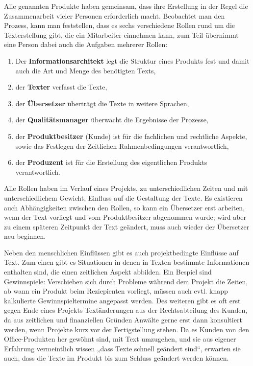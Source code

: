 \documentclass[11pt,a4paper]{article}
\begin{document}
Alle genannten Produkte haben gemeinsam, dass ihre Erstellung in der Regel die Zusammenarbeit vieler Personen erforderlich macht. Beobachtet man den Prozess, kann man feststellen, dass es sechs verschiedene Rollen rund um die Texterstellung gibt, die ein Mitarbeiter einnehmen kann, zum Teil übernimmt eine Person dabei auch die Aufgaben mehrerer Rollen:
\begin{enumerate}
\addtolength{\itemsep}{-0.5\baselineskip}
\item Der \textbf{Informationsarchitekt} legt die Struktur eines Produkts fest und damit auch die Art und Menge des benötigten Texts,
\item der \textbf{Texter} verfasst die Texte,
\item der \textbf{Übersetzer} überträgt die Texte in weitere Sprachen,
\item der \textbf{Qualitätsmanager} überwacht die Ergebnisse der Prozesse,
\item der \textbf{Produktbesitzer} (Kunde) ist für die fachlichen und rechtliche Aspekte, sowie das Festlegen der Zeitlichen Rahmenbedingungen verantwortlich,
\item der \textbf{Produzent} ist für die Erstellung des eigentlichen Produkts verantwortlich.
\end{enumerate}
Alle Rollen haben im Verlauf eines Projekts, zu unterschiedlichen Zeiten und mit unterschiedlichem Gewicht, Einfluss auf die Gestaltung der Texte. Es existieren auch Abhängigkeiten zwischen den Rollen, so kann ein Übersetzer erst arbeiten, wenn der Text vorliegt und vom Produktbesitzer abgenommen wurde; wird aber zu einem späteren Zeitpunkt der Text geändert, muss auch wieder der Übersetzer neu beginnen.

Neben den menschlichen Einflüssen gibt es auch projektbedingte Einflüsse auf Text. Zum einen gibt es Situationen in denen in Texten bestimmte Informationen enthalten sind, die einen zeitlichen Aspekt abbilden. Ein Bespiel sind Gewinnspiele: Verschieben sich durch Probleme während dem Projekt die Zeiten, ab wann ein Produkt beim Reziepienten vorliegt, müssen auch evtl. knapp kalkulierte Gewinnspieltermine angepasst werden. Des weiteren gibt es oft erst gegen Ende eines Projekts Textänderungen aus der Rechtsabteilung des Kunden, da aus zeitlichen und finanziellen Gründen Anwälte gerne erst dann konsultiert werden, wenn Projekte kurz vor der Fertigstellung stehen. Da es Kunden von den Office-Produkten her gewöhnt sind, mit Text umzugehen, und sie aus eigener Erfahrung vermeintlich wissen „dass Texte schnell geändert sind“, erwarten sie auch, dass die Texte im Produkt bis zum Schluss geändert werden können.
\end{document}
